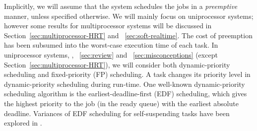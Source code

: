 



Implicitly, we will assume that the system schedules the jobs in a
\emph{preemptive} manner, unless specified otherwise.  We will mainly focus on
uniprocessor systems; however some results for multiprocessor systems
will be discussed in Section~\ref{sec:multiprocessor-HRT} and
\mysectionref{}~\ref{sec:soft-realtime}. 
 The cost of preemption
has been subsumed into the worst-case execution time of each task. In
uniprocessor systems, \ie, \mysectionref{}~\ref{sec:review} and
\mysectionref{}~\ref{sec:misconceptions} (except Section~\ref{sec:multiprocessor-HRT}), we will consider both
dynamic-priority scheduling and fixed-priority (FP)
scheduling. A task changes its priority level in dynamic-priority
scheduling during run-time. One well-known dynamic-priority scheduling
algorithm is the earliest-deadline-first (EDF) scheduling, which gives
the highest priority to the job (in the ready queue) with the earliest
absolute deadline. Variances of EDF scheduling for self-suspending
tasks have been explored in
\cite{RTSS-ChenL14,Liu_2014,DBLP:conf/ecrts/Devi03,WC16-suspend-DATE}.

